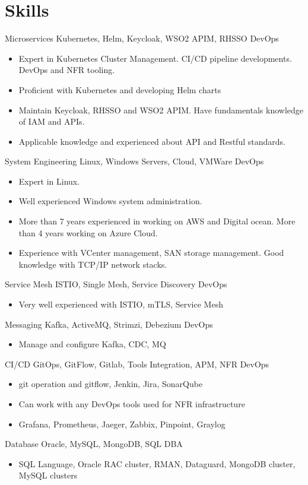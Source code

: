 \documentclass[]{friggeri-cv}
\begin{document}
\section{Skills}
\begin{entrylist}
  \entry
  {Microservices}
  {Kubernetes, Helm, Keycloak, WSO2 APIM, RHSSO}
  {DevOps}
  {  \begin{itemize}
      \item Expert in Kubernetes Cluster Management. CI/CD pipeline developments. DevOps and NFR tooling.
      \item Proficient with Kubernetes and developing Helm charts
      \item Maintain Keycloak, RHSSO and WSO2 APIM. Have fundamentals knowledge of IAM and APIs.
      \item Applicable knowledge and experienced about API and Restful standards.
    \end{itemize}}
    \entry
    {System Engineering}
    {Linux, Windows Servers, Cloud, VMWare}
    {DevOps}
    {  \begin{itemize}
        \item Expert in Linux.
        \item Well experienced Windows system administration.
        \item More than 7 years experienced in working on AWS and Digital ocean. More than 4 years working on Azure Cloud.
        \item Experience with VCenter management, SAN storage management. Good knowledge with TCP/IP network stacks.
      \end{itemize}}
  \entry
  {Service Mesh}
  {ISTIO, Single Mesh, Service Discovery}
  {DevOps}
  {  \begin{itemize}
      \item Very well experienced with ISTIO, mTLS, Service Mesh
    \end{itemize}}
  \entry
  {Messaging}
  {Kafka, ActiveMQ, Strimzi, Debezium}
  {DevOps}
  { \begin{itemize}
      \item Manage and configure Kafka, CDC, MQ
    \end{itemize}}
  \entry
  {CI/CD}
  {GitOps, GitFlow, Gitlab, Tools Integration, APM, NFR}
  {DevOps}
  { \begin{itemize}
      \item git operation and gitflow, Jenkin, Jira, SonarQube
      \item Can work with any DevOps tools used for NFR infrastructure
      \item Grafana, Prometheus, Jaeger, Zabbix, Pinpoint, Graylog
    \end{itemize}}
  \entry
  {Database}
  {Oracle, MySQL, MongoDB, SQL}
  {DBA}
  { \begin{itemize}
      \item SQL Language, Oracle RAC cluster, RMAN, Dataguard, MongoDB cluster, MySQL clusters
    \end{itemize}}
  
\end{entrylist}
\end{document}
